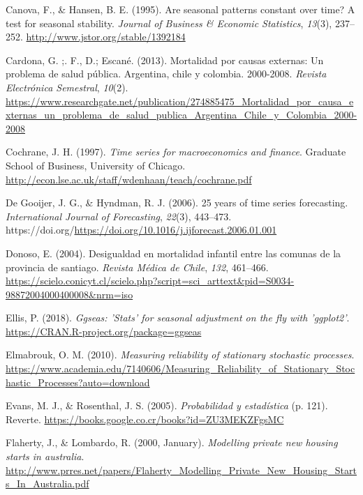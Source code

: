 \documentclass[
]{article}
\newlength{\cslhangindent}
\newlength{\cslentryspacingunit} %
\newenvironment{CSLReferences}[2] %
 {%
  \setlength{\parindent}{0pt}
  \ifodd #1
  \let\oldpar\par
  \def\par{\hangindent=\cslhangindent\oldpar}
  \fi
  \setlength{\parskip}{#2\cslentryspacingunit}
 }%
 {}
\begin{document}
\begin{CSLReferences}{1}{0}
\leavevmode{}%
Canova, F., \& Hansen, B. E. (1995). Are seasonal patterns constant over
time? A test for seasonal stability. \emph{Journal of Business \&
Economic Statistics}, \emph{13}(3), 237--252.
\url{http://www.jstor.org/stable/1392184}

\leavevmode{}%
Cardona, G. ;. F., D.; Escané. (2013). Mortalidad por causas externas:
Un problema de salud pública. Argentina, chile y colombia. 2000-2008.
\emph{Revista Electrónica Semestral}, \emph{10}(2).
\url{https://www.researchgate.net/publication/274885475_Mortalidad_por_causa_externas_un_problema_de_salud_publica_Argentina_Chile_y_Colombia_2000-2008}

\leavevmode{}%
Cochrane, J. H. (1997). \emph{Time series for macroeconomics and
finance}. Graduate School of Business, University of Chicago.
\url{http://econ.lse.ac.uk/staff/wdenhaan/teach/cochrane.pdf}

\leavevmode{}%
De Gooijer, J. G., \& Hyndman, R. J. (2006). 25 years of time series
forecasting. \emph{International Journal of Forecasting}, \emph{22}(3),
443--473.
https://doi.org/\url{https://doi.org/10.1016/j.ijforecast.2006.01.001}

\leavevmode{}%
Donoso, E. (2004). Desigualdad en mortalidad infantil entre las comunas
de la provincia de santiago. \emph{Revista Médica de Chile}, \emph{132},
461--466.
\url{https://scielo.conicyt.cl/scielo.php?script=sci_arttext\&pid=S0034-98872004000400008\&nrm=iso}

\leavevmode{}%
Ellis, P. (2018). \emph{Ggseas: 'Stats' for seasonal adjustment on the
fly with 'ggplot2'}. \url{https://CRAN.R-project.org/package=ggseas}

\leavevmode{}%
Elmabrouk, O. M. (2010). \emph{Measuring reliability of stationary
stochastic processes}.
\url{https://www.academia.edu/7140606/Measuring_Reliability_of_Stationary_Stochastic_Processes?auto=download}

\leavevmode{}%
Evans, M. J., \& Rosenthal, J. S. (2005). \emph{Probabilidad y
estadística} (p. 121). Reverte.
\url{https://books.google.co.cr/books?id=ZU3MEKZFgsMC}

\leavevmode{}%
Flaherty, J., \& Lombardo, R. (2000, January). \emph{Modelling private
new housing starts in australia}.
\url{http://www.prres.net/papers/Flaherty_Modelling_Private_New_Housing_Starts_In_Australia.pdf}


\end{CSLReferences}
\end{document}
